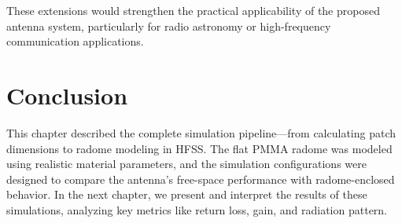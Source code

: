 These extensions would strengthen the practical applicability of the proposed antenna system, particularly for radio astronomy or high-frequency communication applications.

\section*{Conclusion}

This chapter described the complete simulation pipeline—from calculating patch dimensions to radome modeling in HFSS. The flat PMMA radome was modeled using realistic material parameters, and the simulation configurations were designed to compare the antenna’s free-space performance with radome-enclosed behavior. In the next chapter, we present and interpret the results of these simulations, analyzing key metrics like return loss, gain, and radiation pattern.
